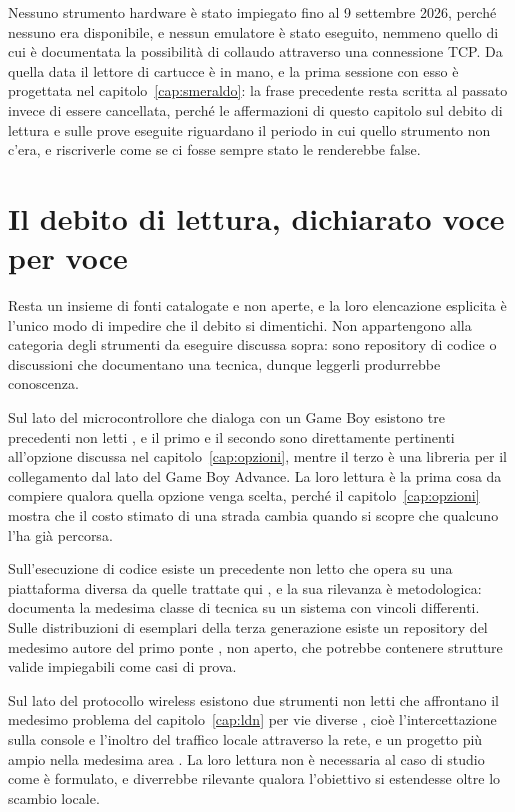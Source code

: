 Nessuno strumento hardware è stato impiegato fino al 9 settembre 2026, perché nessuno era disponibile, e nessun emulatore è stato eseguito, nemmeno quello di cui è documentata la possibilità di collaudo attraverso una connessione TCP. Da quella data il lettore di cartucce è in mano, e la prima sessione con esso è progettata nel capitolo~\ref{cap:smeraldo}: la frase precedente resta scritta al passato invece di essere cancellata, perché le affermazioni di questo capitolo sul debito di lettura e sulle prove eseguite riguardano il periodo in cui quello strumento non c'era, e riscriverle come se ci fosse sempre stato le renderebbe false.


\section{Il debito di lettura, dichiarato voce per voce}

Resta un insieme di fonti catalogate e non aperte, e la loro elencazione esplicita è l'unico modo di impedire che il debito si dimentichi. Non appartengono alla categoria degli strumenti da eseguire discussa sopra: sono repository di codice o discussioni che documentano una tecnica, dunque leggerli produrrebbe conoscenza.

Sul lato del microcontrollore che dialoga con un Game Boy esistono tre precedenti non letti \cite{arduino-boy,arduino-poke-gen2,gba-link-connection}, e il primo e il secondo sono direttamente pertinenti all'opzione discussa nel capitolo~\ref{cap:opzioni}, mentre il terzo è una libreria per il collegamento dal lato del Game Boy Advance. La loro lettura è la prima cosa da compiere qualora quella opzione venga scelta, perché il capitolo~\ref{cap:opzioni} mostra che il costo stimato di una strada cambia quando si scopre che qualcuno l'ha già percorsa.

Sull'esecuzione di codice esiste un precedente non letto che opera su una piattaforma diversa da quelle trattate qui \cite{stadium-ace}, e la sua rilevanza è metodologica: documenta la medesima classe di tecnica su un sistema con vincoli differenti. Sulle distribuzioni di esemplari della terza generazione esiste un repository del medesimo autore del primo ponte \cite{gen3distributions}, non aperto, che potrebbe contenere strutture valide impiegabili come casi di prova.

Sul lato del protocollo wireless esistono due strumenti non letti che affrontano il medesimo problema del capitolo~\ref{cap:ldn} per vie diverse \cite{ldn-mitm,switch-lan-play}, cioè l'intercettazione sulla console e l'inoltro del traffico locale attraverso la rete, e un progetto più ampio nella medesima area \cite{reon}. La loro lettura non è necessaria al caso di studio come è formulato, e diverrebbe rilevante qualora l'obiettivo si estendesse oltre lo scambio locale.

